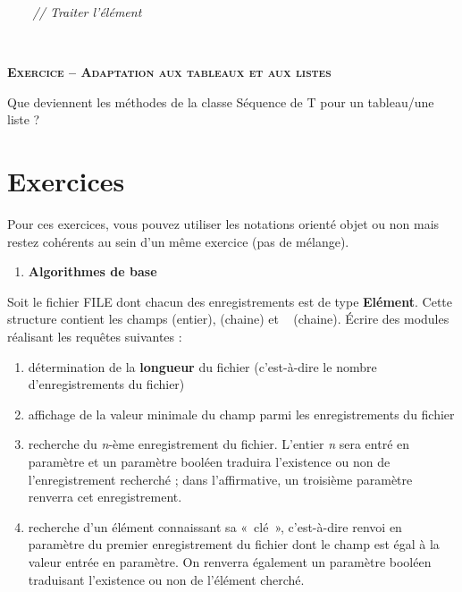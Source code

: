 {\sffamily\itshape
\ \ \ \ // Traiter l'élément}

{\sffamily
\ \   \ \ }

{\sffamily
{} }


\bigskip

{\sffamily\bfseries\scshape
Exercice – Adaptation aux tableaux et aux listes}

{
Que deviennent les méthodes de la classe Séquence de T pour un
tableau/une liste ?}

\section{}
\section{Exercices}
{
Pour ces exercices, vous pouvez utiliser les notations orienté objet ou
non mais restez cohérents au sein d'un même exercice
(pas de mélange).}

\liststyleExercice
\begin{enumerate}
\item {\sffamily\bfseries
Algorithmes de base}
\end{enumerate}
{
Soit le fichier FILE dont chacun des enregistrements est de type
\textbf{Elément}. Cette structure contient les champs
 (entier),  (chaine)
et \  (chaine). Écrire des modules réalisant
les requêtes suivantes :}

\liststyleNumberingv
\begin{enumerate}
\item {
détermination de la \textbf{longueur} du fichier (c’est-à-dire le nombre
d’enregistrements du fichier)}
\item {
affichage de la valeur minimale du champ 
parmi les enregistrements du fichier}
\item {
recherche du \textit{n}{}-ème enregistrement du fichier. L’entier
\textit{n} sera entré en paramètre et un paramètre booléen traduira
l’existence ou non de l’enregistrement recherché ; dans l’affirmative,
un troisième paramètre renverra cet enregistrement.}
\item {
recherche d’un élément connaissant sa «~clé~», c’est-à-dire renvoi en
paramètre du premier enregistrement du fichier dont le champ
 est égal à la valeur 
entrée en paramètre. On renverra également un paramètre booléen
traduisant l’existence ou non de l’élément cherché. }
\end{enumerate}

